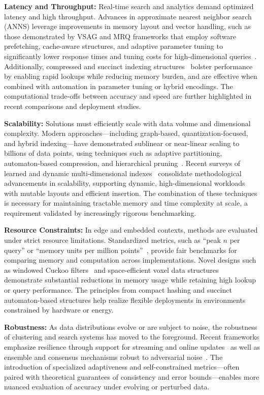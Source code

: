 \documentclass[sigconf]{acmart}
\begin{document}
\textbf{Latency and Throughput:} Real-time search and analytics demand optimized latency and high throughput. Advances in approximate nearest neighbor search (ANNS) leverage improvements in memory layout and vector handling, such as those demonstrated by VSAG and MRQ frameworks that employ software prefetching, cache-aware structures, and adaptive parameter tuning to significantly lower response times and tuning costs for high-dimensional queries~\cite{ref77, ref78, ref117, ref118, ref109}. Additionally, compressed and succinct indexing structures~\cite{ref106, ref79, ref80, ref81, ref87, ref108} bolster performance by enabling rapid lookups while reducing memory burden, and are effective when combined with automation in parameter tuning or hybrid encodings. The computational trade-offs between accuracy and speed are further highlighted in recent comparisons and deployment studies.

\textbf{Scalability:} Solutions must efficiently scale with data volume and dimensional complexity. Modern approaches—including graph-based, quantization-focused, and hybrid indexing—have demonstrated sublinear or near-linear scaling to billions of data points, using techniques such as adaptive partitioning, automaton-based compression, and hierarchical pruning~\cite{ref59, ref79, ref80, ref81, ref106, ref108, ref116}. Recent surveys of learned and dynamic multi-dimensional indexes~\cite{ref110} consolidate methodological advancements in scalability, supporting dynamic, high-dimensional workloads with mutable layouts and efficient insertion. The combination of these techniques is necessary for maintaining tractable memory and time complexity at scale, a requirement validated by increasingly rigorous benchmarking.

\textbf{Resource Constraints:} In edge and embedded contexts, methods are evaluated under strict resource limitations. Standardized metrics, such as ``peak $n$ per query'' or ``memory units per million points''~\cite{ref60, ref79, ref86, ref87}, provide fair benchmarks for comparing memory and computation across implementations. Novel designs such as windowed Cuckoo filters~\cite{ref87} and space-efficient voxel data structures~\cite{ref86} demonstrate substantial reductions in memory usage while retaining high lookup or query performance. The principles from compact hashing and succinct automaton-based structures help realize flexible deployments in environments constrained by hardware or energy.

\textbf{Robustness:} As data distributions evolve or are subject to noise, the robustness of clustering and search systems has moved to the foreground. Recent frameworks emphasize resilience through support for streaming and online updates~\cite{ref64, ref108, ref110} as well as ensemble and consensus mechanisms robust to adversarial noise~\cite{ref116, ref117}. The introduction of specialized adaptiveness and self-constrained metrics—often paired with theoretical guarantees of consistency and error bounds—enables more nuanced evaluation of accuracy under evolving or perturbed data.
\end{document}
